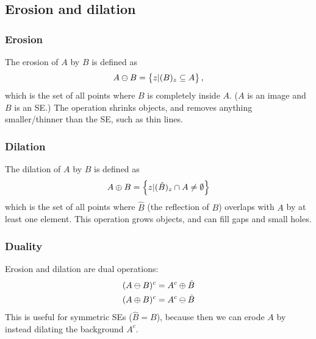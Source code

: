 \subsection{Erosion and dilation}

\subsubsection{Erosion}
The erosion of $A$ by $B$ is defined as
\begin{equation}
    A \ominus B = \left\{ z | (B)_z \subseteq A \right\},
\end{equation}
which is the set of all points where $B$ is completely inside $A$. ($A$ is an image and $B$ is an SE.) The operation shrinks objects, and removes anything smaller/thinner than the SE, such as thin lines.

\subsubsection{Dilation}
The dilation of $A$ by $B$ is defined as
\begin{equation}
    A \oplus B = \left\{ z | (\hat{B})_z \cap A \neq \emptyset \right\}
\end{equation}
which is the set of all points where $\hat{B}$ (the reflection of $B$) overlaps with $A$ by at least one element. This operation grows objects, and can fill gaps and small holes.

\subsubsection{Duality}
Erosion and dilation are dual operations:
\begin{equation}
\begin{split}
    (A \ominus  B)^c &= A^c \oplus \hat{B} \\
    (A \oplus B)^c &= A^c \ominus  \hat{B} \\
\end{split}
\end{equation}
This is useful for symmetric SEs ($\hat{B} = B$), because then we can erode $A$ by instead dilating the background $A^c$.

